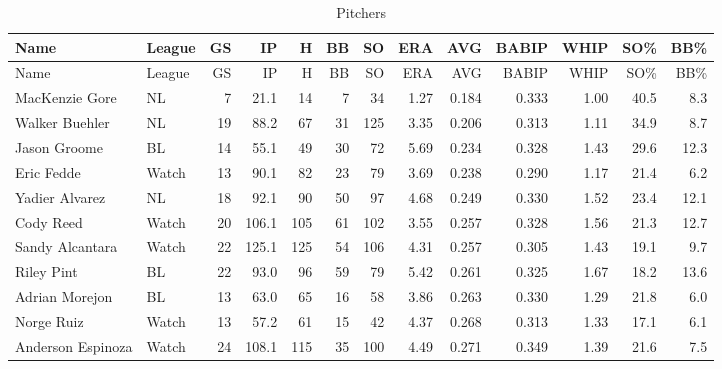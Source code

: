 \documentclass[]{article}
\begin{document}
\begin{longtable}[]{@{}llrrrrrrrrrrr@{}}
\caption{Pitchers}\tabularnewline
\toprule
Name & League & GS & IP & H & BB & SO & ERA & AVG & BABIP & WHIP & SO\%
& BB\%\tabularnewline
\midrule
\endfirsthead
\toprule
Name & League & GS & IP & H & BB & SO & ERA & AVG & BABIP & WHIP & SO\%
& BB\%\tabularnewline
\midrule
\endhead
MacKenzie Gore & NL & 7 & 21.1 & 14 & 7 & 34 & 1.27 & 0.184 & 0.333 &
1.00 & 40.5 & 8.3\tabularnewline
Walker Buehler & NL & 19 & 88.2 & 67 & 31 & 125 & 3.35 & 0.206 & 0.313 &
1.11 & 34.9 & 8.7\tabularnewline
Jason Groome & BL & 14 & 55.1 & 49 & 30 & 72 & 5.69 & 0.234 & 0.328 &
1.43 & 29.6 & 12.3\tabularnewline
Eric Fedde & Watch & 13 & 90.1 & 82 & 23 & 79 & 3.69 & 0.238 & 0.290 &
1.17 & 21.4 & 6.2\tabularnewline
Yadier Alvarez & NL & 18 & 92.1 & 90 & 50 & 97 & 4.68 & 0.249 & 0.330 &
1.52 & 23.4 & 12.1\tabularnewline
Cody Reed & Watch & 20 & 106.1 & 105 & 61 & 102 & 3.55 & 0.257 & 0.328 &
1.56 & 21.3 & 12.7\tabularnewline
Sandy Alcantara & Watch & 22 & 125.1 & 125 & 54 & 106 & 4.31 & 0.257 &
0.305 & 1.43 & 19.1 & 9.7\tabularnewline
Riley Pint & BL & 22 & 93.0 & 96 & 59 & 79 & 5.42 & 0.261 & 0.325 & 1.67
& 18.2 & 13.6\tabularnewline
Adrian Morejon & BL & 13 & 63.0 & 65 & 16 & 58 & 3.86 & 0.263 & 0.330 &
1.29 & 21.8 & 6.0\tabularnewline
Norge Ruiz & Watch & 13 & 57.2 & 61 & 15 & 42 & 4.37 & 0.268 & 0.313 &
1.33 & 17.1 & 6.1\tabularnewline
Anderson Espinoza & Watch & 24 & 108.1 & 115 & 35 & 100 & 4.49 & 0.271 &
0.349 & 1.39 & 21.6 & 7.5\tabularnewline
\bottomrule
\end{longtable}
\end{document}
